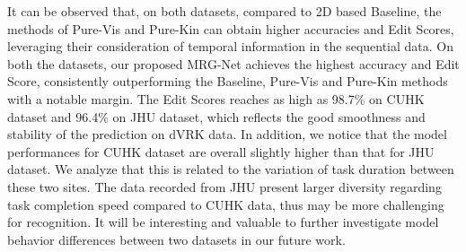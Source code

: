 \documentclass[letterpaper, 10 pt, conference]{ieeeconf}
\begin{document}
It can be observed that, on both datasets, compared to 2D based Baseline, the methods of Pure-Vis and Pure-Kin can obtain higher accuracies and Edit Scores, leveraging their consideration of temporal information in the sequential data.
On both the datasets, our proposed MRG-Net achieves the highest accuracy and Edit Score, consistently outperforming the Baseline, Pure-Vis and Pure-Kin methods with a notable margin. The Edit Scores reaches as high as 98.7\% on CUHK dataset and 96.4\% on JHU dataset, which reflects the good smoothness and stability of the prediction on dVRK data. In addition, we notice that the model performances for CUHK dataset are overall slightly higher than that for JHU dataset.
We analyze that this is related to the variation of task duration between these two sites. The data recorded from JHU present larger diversity regarding task completion speed compared to CUHK data, thus may be more challenging for recognition. It will be interesting and valuable to further investigate model behavior differences between two datasets in our future work.








\begin{table}[t]
\begin{center}
\caption{Results of different methods on Peg Transfer dataset in site CUHK for gesture recognition.}\label{tab_peg_cuhk}
\end{center}
\vspace{-2mm}
\end{table}
\end{document}
